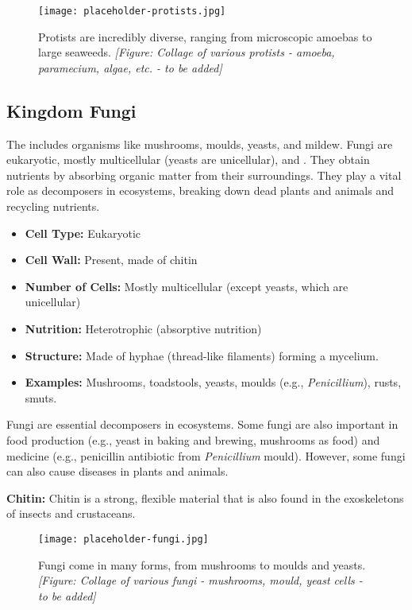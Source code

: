 \begin{figure}
\centering
\texttt{[image: placeholder-protists.jpg]}
\caption{Protists are incredibly diverse, ranging from microscopic amoebas to large seaweeds. \textit{[Figure: Collage of various protists - amoeba, paramecium, algae, etc. - to be added]}}
\end{figure}


\subsection{Kingdom Fungi}

The  includes organisms like mushrooms, moulds, yeasts, and mildew. Fungi are eukaryotic, mostly multicellular (yeasts are unicellular), and .  They obtain nutrients by absorbing organic matter from their surroundings.  They play a vital role as decomposers in ecosystems, breaking down dead plants and animals and recycling nutrients.

\begin{itemize}
    \item \textbf{Cell Type:} Eukaryotic
    \item \textbf{Cell Wall:} Present, made of chitin
    \item \textbf{Number of Cells:} Mostly multicellular (except yeasts, which are unicellular)
    \item \textbf{Nutrition:} Heterotrophic (absorptive nutrition)
    \item \textbf{Structure:} Made of hyphae (thread-like filaments) forming a mycelium.
    \item \textbf{Examples:} Mushrooms, toadstools, yeasts, moulds (e.g., \textit{Penicillium}), rusts, smuts.
\end{itemize}

Fungi are essential decomposers in ecosystems. Some fungi are also important in food production (e.g., yeast in baking and brewing, mushrooms as food) and medicine (e.g., penicillin antibiotic from \textit{Penicillium} mould).  However, some fungi can also cause diseases in plants and animals.

\begin{marginnote}
\textbf{Chitin:} Chitin is a strong, flexible material that is also found in the exoskeletons of insects and crustaceans.
\end{marginnote}

\begin{figure}
\centering
\texttt{[image: placeholder-fungi.jpg]}
\caption{Fungi come in many forms, from mushrooms to moulds and yeasts. \textit{[Figure: Collage of various fungi - mushrooms, mould, yeast cells - to be added]}}
\end{figure}


